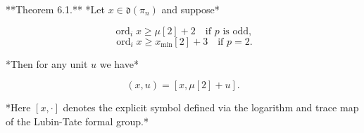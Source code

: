 **Theorem 6.1.** *Let $x \in \mathfrak{d}(\pi_n)$ and suppose*

$$
\operatorname{ord}_i x \ge \mu[2] + 2 \quad \text{if $p$ is odd},
$$
$$
\operatorname{ord}_i x \ge x_{\min}[2] + 3 \quad \text{if $p = 2$}.
$$

*Then for any unit $u$ we have*

$$(x, u) = [x, \mu[2] + u].$$

*Here $[x, \cdot]$ denotes the explicit symbol defined via the logarithm and trace map of the Lubin-Tate formal group.*
